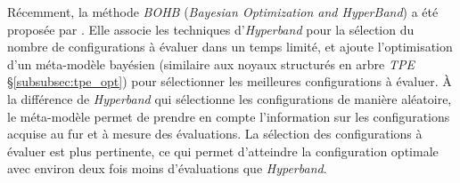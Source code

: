 Récemment, la méthode \textit{BOHB} (\textit{Bayesian Optimization and HyperBand}) a été proposée par \cite{falkner_combining_2017, falkner_bohb_2018}.
Elle associe les techniques d'\textit{Hyperband} pour la sélection du nombre de configurations à évaluer dans un temps limité, et ajoute l'optimisation d'un méta-modèle bayésien (similaire aux noyaux structurés en arbre \textit{TPE} §\ref{subsubsec:tpe_opt}) pour sélectionner les meilleures configurations à évaluer.
À la différence de \textit{Hyperband} qui sélectionne les configurations de manière aléatoire, le méta-modèle permet de prendre en compte l'information sur les configurations acquise au fur et à mesure des évaluations.
La sélection des configurations à évaluer est plus pertinente, ce qui permet d'atteindre la configuration optimale avec environ deux fois moins d'évaluations que \textit{Hyperband}.
%
%
% 
